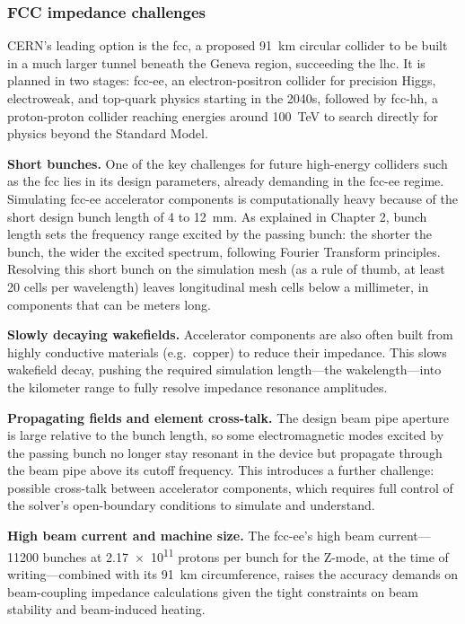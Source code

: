 \subsubsection{FCC impedance challenges}
CERN's leading option is the \gls{fcc}, a proposed \SI{91}{\kilo\meter} circular collider to be built in a much larger tunnel beneath the Geneva region, succeeding the \gls{lhc}. It is planned in two stages: \gls{fcc-ee}, an electron-positron collider for precision Higgs, electroweak, and top-quark physics starting in the 2040s, followed by \gls{fcc}-hh, a proton-proton collider reaching energies around
\SI{100}{\tera\electronvolt} to search directly for physics beyond the Standard Model.

\begin{description}
\item \textbf{Short bunches.} One of the key challenges for future high-energy colliders such as the \gls{fcc} lies in its design parameters,
already demanding in the \gls{fcc-ee} regime. Simulating \gls{fcc-ee} accelerator components is computationally heavy because of the short design bunch length of 4 to \SI{12}{\milli\meter}. As explained in Chapter 2, bunch length sets the frequency range excited by the passing bunch: the shorter the bunch, the wider the excited spectrum, following Fourier Transform principles. Resolving this short bunch on the simulation mesh (as a rule of thumb, at least 20 cells per wavelength) leaves longitudinal mesh cells below a millimeter, in components that can be meters long.

\item \textbf{Slowly decaying wakefields.} Accelerator components are also often built from highly conductive materials (e.g.\ copper) to
reduce their impedance. This slows wakefield decay, pushing the required simulation length---the wakelength---into the kilometer range to fully resolve impedance resonance amplitudes.

\item \textbf{Propagating fields and element cross-talk.} The design beam pipe aperture is large relative to the bunch length, so some
electromagnetic modes excited by the passing bunch no longer stay resonant in the device but propagate through the beam pipe above its cutoff frequency. This introduces a further challenge: possible cross-talk between accelerator components, which requires full control of the solver's open-boundary conditions to simulate and understand.

\item \textbf{High beam current and machine size.} The \gls{fcc-ee}'s high beam current---11200 bunches at \num{2.17e11} protons per bunch for the
Z-mode, at the time of writing---combined with its \SI{91}{\kilo\meter} circumference, raises the accuracy demands on beam-coupling impedance calculations given the tight constraints on beam stability and beam-induced heating.
\end{description}

